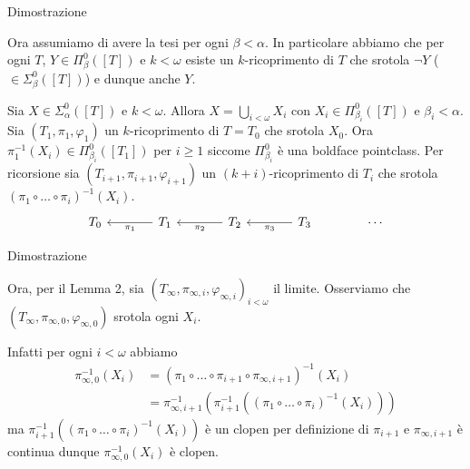 \documentclass[aspectratio=43]{beamer}
\begin{document}
\begin{frame}{Dimostrazione}
  \begin{block}{}
    Ora assumiamo di avere la tesi per ogni \(\beta < \alpha\).
    In particolare abbiamo che per ogni \(T\), \(Y \in \Pi^0_\beta([T])\) e \(k < \omega\) esiste un \(k\)-ricoprimento di \(T\) che srotola \(\neg Y\) (\(\in \Sigma^0_\beta([T])\)) e dunque anche \(Y\).
  \end{block}
  \pause
  \begin{block}{}
    Sia \(X \in \Sigma^0_\alpha([T])\) e \(k < \omega\).
    Allora \(X = \bigcup_{i<\omega}X_i\) con \(X_i \in \Pi^0_{\beta_i}([T])\) e \(\beta_i < \alpha\).
    Sia \((T_1, \pi_1, \varphi_1)\) un \(k\)-ricoprimento di \(T = T_0\) che srotola \(X_0\).
    Ora \(\pi_1^{-1}(X_i) \in \Pi^0_{\beta_i}([T_1])\) per \(i \geq 1\) siccome \(\Pi^0_{\beta_i}\) è una boldface pointclass.
    Per ricorsione sia \((T_{i+1}, \pi_{i+1}, \varphi_{i+1})\) un \((k+i)\)-ricoprimento di \(T_i\) che srotola \((\pi_1 \circ \ldots \circ \pi_i)^{-1}(X_i)\).
    \begin{equation*}
      \begin{tikzcd}[sep = large, ampersand replacement=\&]
        T_0 \& T_1 \ar[l, "\pi_1"] \& T_2 \ar[l, "\pi_2"] \& T_3 \ar[l, "\pi_3"] \& \cdots
      \end{tikzcd}
    \end{equation*}
  \end{block}
\end{frame}

\begin{frame}{Dimostrazione}
  \begin{block}{}
    Ora, per il Lemma 2, sia \((T_\infty, \pi_{\infty, i}, \varphi_{\infty, i})_{i<\omega}\) il limite.
    Osserviamo che \((T_\infty, \pi_{\infty, 0}, \varphi_{\infty, 0})\) srotola ogni \(X_i\).
  \end{block}
  \pause
  \begin{block}{}
    Infatti per ogni \(i < \omega\) abbiamo
    \begin{align*}
      \pi_{\infty, 0}^{-1}(X_i) &= (\pi_1 \circ \ldots \circ \pi_{i+1} \circ \pi_{\infty, i+1})^{-1}(X_i) \\
                         &= \pi_{\infty, i+1}^{-1}(\pi_{i+1}^{-1}((\pi_1 \circ \ldots \circ \pi_i)^{-1}(X_i)))
    \end{align*}
    ma \(\pi_{i+1}^{-1}((\pi_1 \circ \ldots \circ \pi_i)^{-1}(X_i))\) è un clopen per definizione di \(\pi_{i+1}\) e \(\pi_{\infty, i+1}\) è continua dunque \(\pi_{\infty, 0}^{-1}(X_i)\) è clopen.
  \end{block}
\end{frame}
\end{document}
